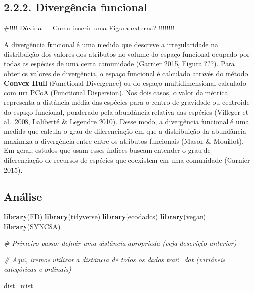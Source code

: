 \documentclass[
]{book}
\newenvironment{Shaded}{\begin{snugshade}}{\end{snugshade}}
\newcommand{\CommentTok}[1]{\textcolor[rgb]{0.56,0.35,0.01}{\textit{#1}}}
\newcommand{\KeywordTok}[1]{\textcolor[rgb]{0.13,0.29,0.53}{\textbf{#1}}}
\newcommand{\NormalTok}[1]{#1}
\begin{document}
\hypertarget{diverguxeancia-funcional}{%
\subsection{2.2.2. Divergência funcional}\label{diverguxeancia-funcional}}

\#!!!! Dúvida --- Como inserir uma Figura externa? !!!!!!!!

A divergência funcional é uma medida que descreve a irregularidade na distribuição dos valores dos atributos no volume do espaço funcional ocupado por todas as espécies de uma certa comunidade (Garnier 2015, Figura ???). Para obter os valores de divergência, o espaço funcional é calculado através do método \textbf{Convex Hull} (Functional Divergence) ou do espaço multidimensional calculado com um PCoA (Functional Dispersion). Nos dois casos, o valor da métrica representa a distância média das espécies para o centro de gravidade ou centroide do espaço funcional, ponderado pela abundância relativa das espécies (Villeger et al.~2008, Laliberté \& Legendre 2010). Desse modo, a divergência funcional é uma medida que calcula o grau de diferenciação em que a distribuição da abundância maximiza a divergência entre entre os atributos funcionais (Mason \& Mouillot). Em geral, estudos que usam esses índices buscam entender o grau de diferenciação de recursos de espécies que coexistem em uma comunidade (Garnier 2015).

\hypertarget{anuxe1lise}{%
\subsection{Análise}\label{anuxe1lise}}

\begin{Shaded}
\begin{Highlighting}[]
\KeywordTok{library}\NormalTok{(FD)}
\KeywordTok{library}\NormalTok{(tidyverse)}
\KeywordTok{library}\NormalTok{(ecodados)}
\KeywordTok{library}\NormalTok{(vegan)}
\KeywordTok{library}\NormalTok{(SYNCSA)}


\CommentTok{# Primeiro passo: definir uma distância apropriada (veja descrição anterior)}

\CommentTok{# Aqui, iremos utilizar a distância de todos os dados trait_dat (variáveis categóricas e ordinais)}

\NormalTok{dist_mist}
\end{Highlighting}
\end{Shaded}
\end{document}
